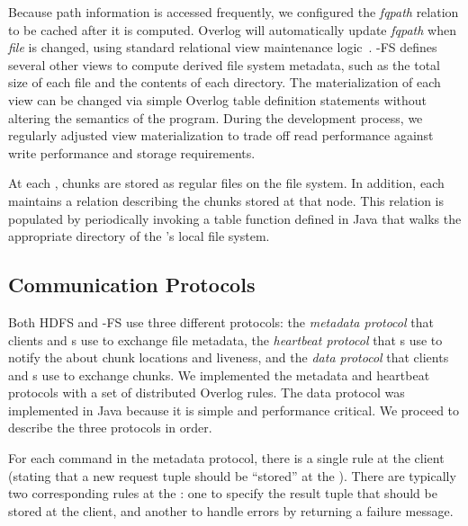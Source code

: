 Because path information is accessed frequently, we configured the \emph{fqpath}
relation to be cached after it is computed. Overlog will automatically update
\emph{fqpath} when \emph{file} is changed, using standard relational view
maintenance logic~\cite{ullmanbook}. \BOOM-FS defines several other views to
compute derived file system metadata, such as the total size of each file and
the contents of each directory. The materialization of each view can be changed
via simple Overlog table definition statements without altering the semantics of
the program. During the development process, we regularly adjusted view
materialization to trade off read performance against write performance and
storage requirements.

At each \DN, chunks are stored as regular files on the file system. In
addition, each {\DN} maintains a relation describing the chunks stored
at that node. This relation is populated by periodically invoking a
table function defined in Java that walks the appropriate directory of
the {\DN}'s local file system.


\subsection{Communication Protocols}
Both HDFS and \BOOM-FS use three different protocols: the \emph{metadata
  protocol} that clients and {\NN}s use to exchange file metadata, the
\emph{heartbeat protocol} that {\DN}s use to notify the {\NN} about chunk
locations and {\DN} liveness, and the \emph{data protocol} that clients and
{\DN}s use to exchange chunks. We implemented the metadata and heartbeat
protocols with a set of distributed Overlog rules.  The data protocol was
implemented in Java because it is simple and performance critical. We proceed to
describe the three protocols in order.

For each command in the metadata protocol, there is a single rule at
the client (stating that a new request tuple should be ``stored'' at
the {\NN}). There are typically two corresponding rules at the {\NN}:
one to specify the result tuple that should be stored at the client,
and another to handle errors by returning a failure message. 

